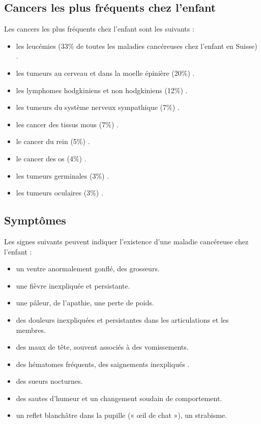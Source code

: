 \documentclass[12pt]{article}
\begin{document}
\subsection{Cancers les plus fréquents chez l’enfant}
Les cancers les plus fréquents chez l’enfant \cite{34} sont les suivants :
\begin{itemize}
	\item les leucémies (33\% de toutes les maladies cancéreuses chez l’enfant en Suisse) \cite{35}.
	\item les tumeurs au cerveau et dans la moelle épinière (20\%) .
	\item les lymphomes hodgkiniens et non hodgkiniens (12\%) .
	\item les tumeurs du système nerveux sympathique (7\%) .
	\item les cancer des tissus mous (7\%) .
	\item le cancer du rein (5\%) .
	\item le cancer des os (4\%) .
	\item les tumeurs germinales (3\%) .
	\item les tumeurs oculaires (3\%) .
\end{itemize}

\newpage

\subsection{Symptômes}
Les signes suivants peuvent indiquer l’existence d’une maladie cancéreuse chez l’enfant \cite{34}:
\begin{itemize}
	\item un ventre anormalement gonflé, des grosseurs.  
	\item une fièvre inexpliquée et persistante. 
	\item une pâleur, de l’apathie, une perte de poids. 
	\item des douleurs inexpliquées et persistantes dans les articulations et les membres.
	\item des maux de tête, souvent associés à des vomissements. 
	\item des hématomes fréquents, des saignements inexpliqués . 
	\item des sueurs nocturnes. 
	\item des sautes d’humeur et un changement soudain de comportement. 
	\item un reflet blanchâtre dans la pupille (« œil de chat »), un strabisme.
\end{itemize}
\end{document}
